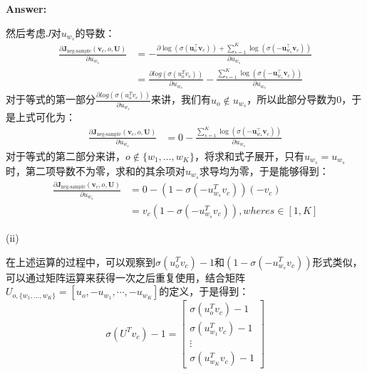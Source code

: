 \documentclass{article}
\newenvironment{answer}{
    {\bf Answer:} \sf \begingroup\color{red}
}{\endgroup}%
\begin{document}
\begin{enumerate}[label=(\alph*)]
\begin{shaded}
\begin{answer}
然后考虑$J$对$u_{w_s}$的导数：
\begin{equation}
	\begin{array}{cl}
 \frac{\partial \bm J_{\text{neg-sample}}(\bm v_c, o, \bm U)}{\partial  u_{w_s}} &= -\frac{\partial \log(\sigma(\bm u_o^\top \bm v_c)) + \sum_{s=1}^K \log(\sigma(-\bm u_{w_s}^\top \bm v_c)) }{\partial u_{w_s}}\\ 	
 &= \frac{\partial log(\sigma(u_o^T v_c))}{\partial u_{w_s}}- \frac{\sum_{s=1}^K \log(\sigma(-\bm u_{w_s}^\top \bm v_c))}{\partial u_{w_s}}
 \end{array}
\end{equation}
对于等式的第一部分$\frac{\partial log(\sigma(u_o^T v_c))}{\partial u_{w_s}}$来讲，我们有$u_o \notin u_{w_s}$，所以此部分导数为0，于是上式可化为：
\begin{equation}
	\begin{array}{cl}
 \frac{\partial \bm J_{\text{neg-sample}}(\bm v_c, o, \bm U)}{\partial  u_{w_s}} &=  0 -\frac{\sum_{s=1}^K \log(\sigma(-\bm u_{w_s}^\top \bm v_c))}{\partial u_{w_s}}
 \end{array} 
\end{equation}
对于等式的第二部分来讲，$o \notin \{w_1,\dots,w_K\}$，将求和式子展开，只有$u_{w_s} = u_{w_s}$时，第二项导数不为零，求和的其余项对$u_{w_s}$求导均为零，于是能够得到：
\begin{equation}
	\begin{array}{cl}
 \frac{\partial \bm J_{\text{neg-sample}}(\bm v_c, o, \bm U)}{\partial  u_{w_s}} &=  0-(1-\sigma(-u_{w_s}^Tv_c))(-v_c) \\
 & = v_c(1-\sigma(-u_{w_s}^Tv_c)) , where s\in [1,K]
 \end{array}
\end{equation}

(ii)

在上述运算的过程中，可以观察到$\sigma(u_o^T v_c)-1$和$(1-\sigma(-u_{w_s}^T v_c))$形式类似，可以通过矩阵运算来获得一次之后重复使用，结合矩阵$U_{o,\{w_1,\dots,w_K\}}=\left[u_o,-u_{w_1},\cdots,-u_{w_K}\right]$的定义，于是得到：
\begin{equation}
	\sigma(U^T v_c)-1 = \left[
	\begin{array}{c}
		\sigma(u_o^T v_c)-1 \\
		\sigma(u_{w_1}^T v_c)-1 \\
		\vdots \\
		\sigma(u_{w_K}^T v_c)-1
	\end{array}
	\right]
\end{equation}



\end{answer}
\end{shaded}
\end{enumerate}
\end{document}

